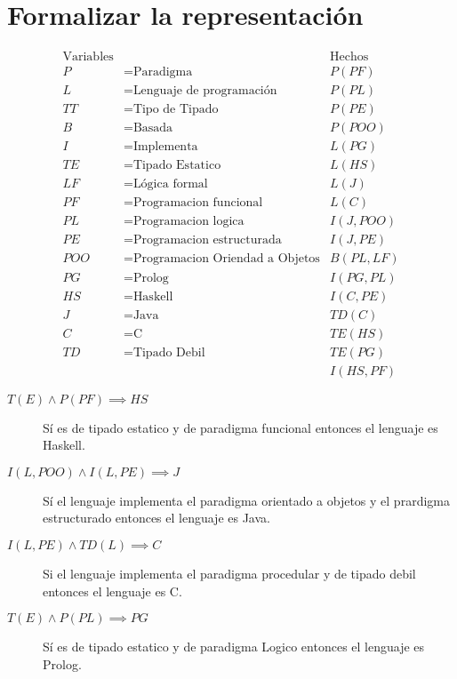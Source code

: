 \documentclass[11pt]{article}
\begin{document}
\section{Formalizar la representación}
\label{sec:org6aa1b95}
\[\begin{align*}
\text{Variables} & & \text{Hechos} \\
P &= \text{Paradigma} & P(PF) \\
L &= \text{Lenguaje de programación} & P(PL) \\
TT &= \text{Tipo de Tipado} & P(PE) \\
B &= \text{Basada} & P(POO) \\
I &= \text{Implementa} & L(PG) \\
TE &= \text{Tipado Estatico} & L(HS) \\
LF &= \text{Lógica formal} & L(J)\\
PF &= \text{Programacion funcional} & L(C) \\
PL &= \text{Programacion logica} & I(J,POO) \\
PE &= \text{Programacion estructurada} & I(J,PE) \\
POO &= \text{Programacion Oriendad a Objetos} & B(PL,LF) \\
PG &= \text{Prolog} & I(PG,PL) \\
HS &= \text{Haskell} & I(C,PE) \\
J &= \text{Java} & TD(C) \\
C &= \text{C} & TE(HS) \\
TD &= \text{Tipado Debil} & TE(PG) \\
& & I(HS,PF) 
\end{align*}\]

\begin{description}
\item[{\(T(E) \land P(PF) \implies HS\)}] Sí es de tipado estatico y de
paradigma funcional entonces el lenguaje es Haskell.

\item[{\(I(L, POO) \land I(L, PE) \implies J\)}] Sí el lenguaje
implementa el paradigma orientado a objetos y el prardigma
estructurado entonces el lenguaje es Java.

\item[{\(I(L, PE) \land TD(L) \implies C\)}] Si el lenguaje implementa
el paradigma procedular y de tipado debil entonces el lenguaje es C.

\item[{\(T(E) \land P(PL) \implies PG\)}] Sí es de tipado estatico y de
paradigma Logico entonces el lenguaje es Prolog.
\end{description}
\end{document}
